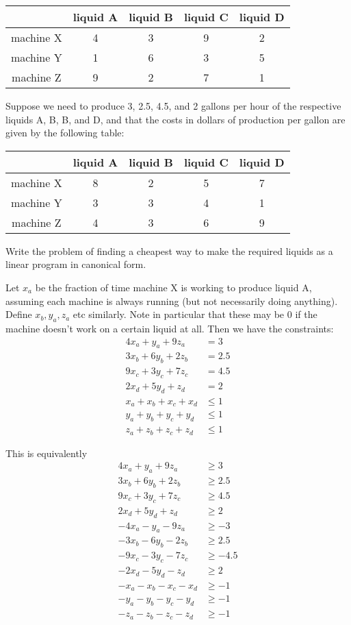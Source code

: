 \documentclass{article}
\begin{document}
\begin{itemize}
		\begin{center}
			\begin{tabular}{c|cccc}
				& liquid A & liquid B & liquid C & liquid D \\
				\hline
				machine X & 4 & 3 & 9 & 2 \\
				machine Y & 1 & 6 & 3 & 5 \\
				machine Z & 9 & 2 & 7 & 1
			\end{tabular}
		\end{center}
		Suppose we need to produce 3, 2.5, 4.5, and 2 gallons per hour of the respective liquids A, B, B, and D, and that the costs in dollars of production per gallon are given by the following table:

		\begin{center}
			\begin{tabular}{c|cccc}
				& liquid A & liquid B & liquid C & liquid D \\
				\hline
				machine X & 8 & 2 & 5 & 7 \\
				machine Y & 3 & 3 & 4 & 1 \\
				machine Z & 4 & 3 & 6 & 9
			\end{tabular}
		\end{center}
		Write the problem of finding a cheapest way to make the required liquids as a linear program in canonical form.
		\begin{soln}
			Let $x_a$ be the fraction of time machine X is working to produce liquid A, assuming each machine is always running (but not necessarily doing anything). Define $x_b, y_a, z_a$ etc similarly. Note in particular that these may be 0 if the machine doesn't work on a certain liquid at all. Then we have the constraints:
			\begin{align*}
				4x_a+y_a+9z_a &= 3 \\
				3x_b+6y_b+2z_b &= 2.5 \\
				9x_c+3y_c+7z_c &= 4.5 \\
				2x_d + 5y_d + z_d &= 2 \\
				x_a+x_b+x_c+x_d &\le 1 \\
				y_a+y_b+y_c+y_d &\le 1 \\
				z_a+z_b+z_c+z_d &\le 1
			\end{align*}

			This is equivalently
			\begin{align*}
				4x_a+y_a+9z_a &\ge 3 \\
				3x_b+6y_b+2z_b &\ge 2.5 \\
				9x_c+3y_c+7z_c &\ge 4.5 \\
				2x_d + 5y_d + z_d &\ge 2 \\
				-4x_a-y_a-9z_a &\ge -3 \\
				-3x_b-6y_b-2z_b &\ge 2.5 \\
				-9x_c-3y_c-7z_c &\ge -4.5 \\
				-2x_d-5y_d-z_d &\ge 2 \\
				-x_a-x_b-x_c-x_d &\ge -1 \\
				-y_a-y_b-y_c-y_d &\ge -1 \\
				-z_a-z_b-z_c-z_d &\ge -1
			\end{align*}


\end{soln}
\end{itemize}
\end{document}
